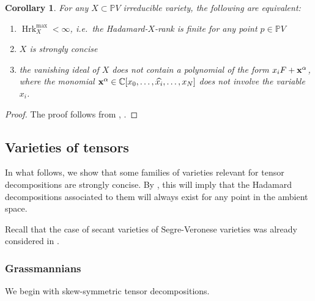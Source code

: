 \documentclass{amsart}
\theoremstyle{plain}
\numberwithin{theorem}{section}
\newtheorem{corollary}[theorem]{Corollary}
\theoremstyle{definition}
\newcommand{\bbC}{\mathbb{C}}
\newcommand{\bbP}{\mathbb{P}}
\newcommand{\Hrk}{\operatorname{Hrk}}
\begin{document}
\begin{corollary}
    For any $X \subset \bbP V$ irreducible variety, the following are equivalent:
    \begin{enumerate}
        \item $\Hrk_X^{\max}< \infty$, i.e.\ the Hadamard-$X$-rank is finite for any point $p \in \bbP V$
        \item $X$ is strongly concise
        \item the vanishing ideal of $X$ does not contain a polynomial of the form $x_i F+ {\bf x}^{\alpha}$, where the monomial ${\bf x}^\alpha \in \bbC[x_0,\ldots,\widehat{x_i},\ldots,x_N]$ does not involve the variable $x_i$.
    \end{enumerate}
\end{corollary}
\begin{proof}
    The proof follows from , .
\end{proof}

\subsection{Varieties of tensors}\label{ssec:tensors}

In what follows, we show that some families of varieties relevant for tensor decompositions are strongly concise. By , this will imply that the Hadamard decompositions associated to them will always exist for any point in the ambient space.

Recall that the case of secant varieties of Segre-Veronese varieties was already considered in \cite{hadamardranks}.

\subsubsection{Grassmannians} We begin with skew-symmetric tensor decompositions.
\end{document}
